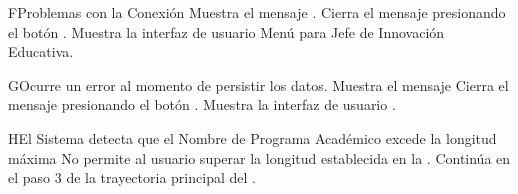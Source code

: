 \begin{UCtrayectoriaA}{F}{Problemas con la Conexión}
    \UCpaso Muestra el mensaje .
    \UCpaso[\UCactor] Cierra el mensaje presionando el botón .
\UCpaso Muestra la interfaz de usuario Menú para Jefe de Innovación Educativa.
\end{UCtrayectoriaA}

\begin{UCtrayectoriaA}{G}{Ocurre un error al momento de persistir los datos.}
    \UCpaso Muestra el mensaje 
    \UCpaso[\UCactor] Cierra el mensaje presionando el botón .
    \UCpaso Muestra la interfaz de usuario .
\end{UCtrayectoriaA}
\begin{UCtrayectoriaA}{H}{El Sistema detecta que el Nombre de Programa Académico excede la longitud máxima}
    \UCpaso No permite al usuario superar la longitud establecida en la .
    \UCpaso Continúa en el paso 3 de la trayectoria principal del .
\end{UCtrayectoriaA}
